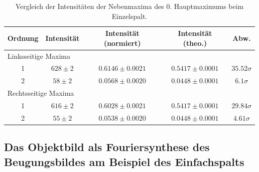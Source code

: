 \begin{table}[H]
  \centering
  \caption{Vergleich der Intensitäten der Nebenmaxima des 0. Hauptmaximums beim Einzelspalt.}
  \vspace*{0.5em}
  \begin{tabular}{|c|c|c|c|c|}\hline
    Ordnung & Intensität & Intensität (normiert) & Intensität (theo.) & Abw.\\\hline
    \multicolumn{5}{|l|}{Linksseitige Maxima}\\\hline
    1 & $628 \pm 2$   & $0.6146 \pm 0.0021$    &  $0.5417 \pm 0.0001$     &   $35.52\sigma$\\
    2 & $58 \pm 2$    & $0.0568 \pm 0.0020$    &  $0.0448 \pm 0.0001$     &   $6.1\sigma$\\\hline
    \multicolumn{5}{|l|}{Rechtsseitige Maxima}\\\hline
    1 & $616 \pm 2$  &  $0.6028 \pm 0.0021$    &  $0.5417 \pm 0.0001$   &     $29.84\sigma$\\
    2 & $55 \pm 2$   &  $0.0538 \pm 0.0020$    &  $0.0448 \pm 0.0001$   &     $4.61\sigma$\\\hline
  \end{tabular}
  \label{tab:es_vergleich_intensitaet}
\end{table}

\newpage
\subsection{Das Objektbild als Fouriersynthese des Beugungsbildes am Beispiel des Einfachspalts}

